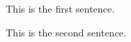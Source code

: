 \documentclass{article}
\begin{document}
This is the first sentence.

This is the second sentence.
\end{document}
